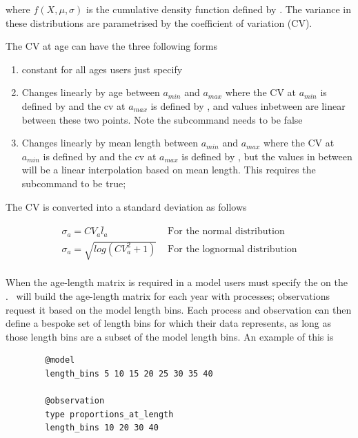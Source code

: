 where \(f(X,\mu, \sigma)\) is the cumulative density function defined by . The variance in these distributions are parametrised by the coefficient of variation (CV).

The CV at age can have the three following forms

\begin{enumerate}
	\item constant for all ages users just specify \\
	\item Changes linearly by age between \(a_{min}\) and \(a_{max}\) where the CV at \(a_{min}\) is defined by  and the cv at \(a_{max}\) is defined by , and values inbetween are linear between these two points. Note the subcommand  needs to be false
	\item Changes linearly by mean length between \(a_{min}\) and \(a_{max}\) where the CV at \(a_{min}\) is defined by  and the cv at \(a_{max}\) is defined by , but the values in between will be a linear interpolation based on mean length. This requires the subcommand  to be true;
\end{enumerate}

The CV is converted into a standard deviation as follows

\begin{align*}
	\sigma_a = CV_a \bar{l}_a & \text{ For the normal distribution}\\
	\sigma_a = \sqrt{log(CV_a^2 + 1)} & \text{ For the lognormal distribution}\\	
\end{align*}

When the age-length matrix is required in a model users must specify the  on the . \CNAME\ will build the age-length matrix for each year with processes; observations request it based on the model length bins. Each process and observation can then define a bespoke set of length bins for which their data represents, as long as those length bins are a subset of the model length bins. An example of this is

{\small{\begin{verbatim}
		@model
		length_bins 5 10 15 20 25 30 35 40 
		
		@observation 
		type proportions_at_length
		length_bins 10 20 30 40
\end{verbatim}}}

